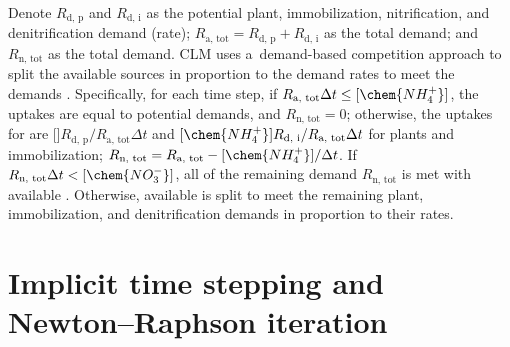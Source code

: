 \documentclass[gmd,noline]{copernicus}
\begin{document}
      Denote $R_{\text{d, p}}$ and $R_{\text{d, i}}$ as the potential plant,
      immobilization, nitrification, and denitrification demand (rate);
      $R_{\text{a, tot}}=R_{\text{d, p}}+R_{\text{d, i}}$ as the total
       demand; and $R_{\text{n, tot}}$ as the total
       demand. CLM uses a~demand-based competition approach to
      split the available sources in proportion to the demand rates to meet
      the demands \citep{Oleson2013,Thornton2005}. Specifically, for each
      time step, if $R_{\text{a, tot}}\Delta t \leq [\chem{NH_4^+}]$, the
      uptakes are equal to potential demands, and $R_{\text{n, tot}}=0$;
      otherwise, the uptakes for  are
      []$R_{\text{d, p}}/R_{\text{a, tot}}\Delta t$ and
      $[\chem{NH_4^+}] R_{\text{d, i}}/R_{\text{a, tot}}\Delta t$ for plants
      and immobilization; $R_{\text{n, tot}}=R_{\text{a,
      tot}}-[\chem{NH_4^+}]/\Delta t$. If $R_{\text{n, tot}}\Delta t <
      [\chem{NO_3^-}]$, all of the remaining demand $R_{\text{n, tot}}$ is
      met with available . Otherwise, available 
      is split to meet the remaining plant, immobilization, and
      denitrification demands in proportion to their rates.




\section{Implicit time stepping and Newton--Raphson iteration}%
\label{sec:newton}
\end{document}
